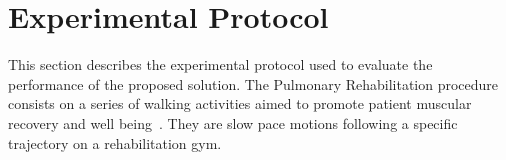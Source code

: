 \documentclass[journal]{IEEEtran}
\begin{document}






\section{Experimental Protocol} \label{experimental}

This section describes the experimental protocol used to evaluate the performance of the proposed solution.  The Pulmonary Rehabilitation procedure consists on a series of walking activities aimed to promote patient muscular recovery and well being~\cite{Wu2012}. They are slow pace motions following a specific trajectory on a rehabilitation gym.
\end{document}
